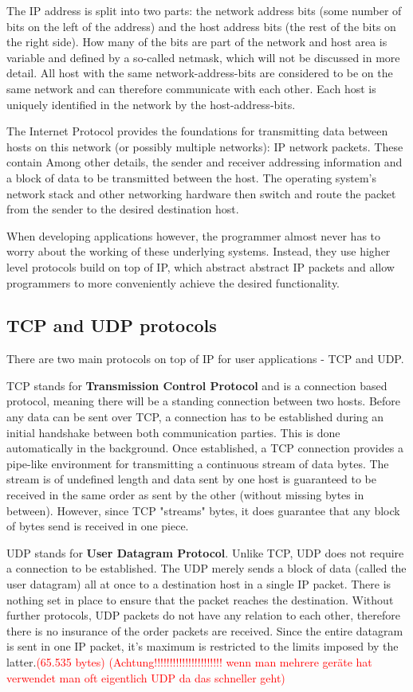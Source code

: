\documentclass[conference]{IEEEtran}
\begin{document}
The IP address is split into two parts: the network address bits (some number of bits on the left of the address) and the host address bits (the rest of the bits on the right side). How many of the bits are part of the network and host area is variable and defined by a so-called netmask, which will not be discussed in more detail. All host with the same network-address-bits are considered to be on the same network and can therefore communicate with each other. Each host is uniquely identified in the network by the host-address-bits.

The Internet Protocol provides the foundations for transmitting data between hosts on this network (or possibly multiple networks): IP network packets. These contain Among other details, the sender and receiver addressing information and a block of data to be transmitted between the host. The operating system's network stack and other networking hardware then switch and route the packet from the sender to the desired destination host.

When  developing applications however, the programmer almost never has to worry about the working of these underlying systems. Instead, they use higher level protocols build on top of IP, which abstract abstract IP packets and allow programmers to more conveniently achieve the desired functionality.

\subsection{TCP and UDP protocols}

There are two main protocols on top of IP for user applications - TCP and UDP. 

TCP stands for \textbf{Transmission Control Protocol} and is a connection based protocol, meaning there will be a standing connection between two hosts. Before any data can be sent over TCP, a connection has to be established during an initial handshake between both communication parties. This is done automatically in the background. Once established, a TCP connection provides a pipe-like environment for transmitting a continuous stream of data bytes. The stream is of undefined length and data sent by one host is guaranteed to be received in the same order as sent by the other (without missing bytes in between). However, since TCP "streams" bytes, it does guarantee that any block of bytes send is received in one piece.

UDP stands for \textbf{User Datagram Protocol}. Unlike TCP, UDP does not require a connection to be established. The UDP merely sends a block of data (called the user datagram) all at once to a destination host in a single IP packet. There is nothing set in place to ensure that the packet reaches the destination. Without further protocols, UDP packets do not have any relation to each other, therefore there is no insurance of the order packets are received. Since the entire datagram is sent in one IP packet, it's maximum is restricted to the limits imposed by the latter.\textcolor{red}{(65.535 bytes)} \textcolor{red}{(Achtung!!!!!!!!!!!!!!!!!!!!!! wenn man mehrere geräte hat verwendet man oft eigentlich UDP da das schneller geht)}
\end{document}
